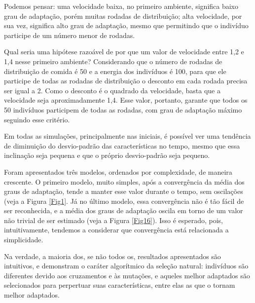 \documentclass[10pt,brazil,english]{article}
\begin{document}
        Podemos pensar: uma velocidade baixa, no primeiro ambiente, significa baixo grau de adaptação, porém muitas rodadas de distribuição; alta velocidade, por sua vez, significa alto grau de adaptação, mesmo que permitindo que o indivíduo participe de um número menor de rodadas.
        
        Qual seria uma hipótese razoável de por que um valor de velocidade entre 1,2 e 1,4 nesse primeiro ambiente? Considerando que o número de rodadas de distribuição de comida é 50 e a energia dos indivíduos é 100, para que ele participe de todas as rodadas de distribuição o desconto em cada rodada precisa ser igual a 2. Como o desconto é o quadrado da velocidade, basta que a velocidade seja aproximadamente 1,4. Esse valor, portanto, garante que todos os 50 indivíduos participem de todas as rodadas, com grau de adaptação máximo seguindo esse critério.
        
        Em todas as simulações, principalmente nas iniciais, é possível ver uma tendência de diminuição do desvio-padrão das características no tempo, mesmo que essa inclinação seja pequena e que o próprio desvio-padrão seja pequeno.
        
        Foram apresentados três modelos, ordenados por complexidade, de maneira crescente. O primeiro modelo, muito simples, após a convergência da média dos graus de adaptação, tende a manter esse valor durante o tempo, sem oscilações (veja a Figura \ref{Fig1}. Já no último modelo, essa convergência não é tão fácil de ser reconhecida, e a média dos graus de adaptação oscila em torno de um valor não trivial de ser estimado (veja a Figura \ref{Fig16}). Isso é esperado, pois, intuitivamente, tendemos a considerar que convergência está relacionada a simplicidade.
        
        Na verdade, a maioria dos, se não todos os, resultados apresentados são intuitivos, e demonstram o caráter algorítmico da seleção natural: indivíduos são diferentes devido aos cruzamentos e às mutações, e aqueles melhor adaptados são selecionados para perpertuar suas características, entre elas as que o tornam melhor adaptados.
    
    
    
    \nocite{carykh2015}
\end{document}

